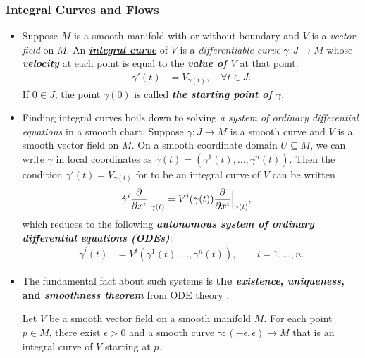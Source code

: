 \documentclass[11pt]{article}
\begin{document}
\subsubsection{Integral Curves and Flows}
\begin{itemize}
\item \begin{definition}
 Suppose $M$ is a smooth manifold with or without boundary and $V$ is a \emph{vector field} on $M$.  An \underline{\emph{\textbf{integral curve}}} of $V$ is a \emph{differentiable curve} $\gamma: J \rightarrow M$ whose \emph{\textbf{velocity}} at each point is equal to the \emph{\textbf{value of $V$}} at that point:
 \begin{align*}
 \gamma'(t) &= V_{\gamma(t)}, \quad \forall t\in J.
 \end{align*} If $0 \in J$, the point $\gamma(0)$ is called \emph{\textbf{the starting point of $\gamma$}}.
\end{definition}

\item \begin{remark}
Finding integral curves boils down to solving \emph{a system of ordinary differential equations} in a smooth chart.  Suppose $\gamma: J \rightarrow M$ is a smooth curve and $V$ is a smooth vector field on $M$. On a smooth coordinate domain $U \subseteq M$, we can write $\gamma$ in local coordinates as $\gamma(t) = (\gamma^{1}(t), \ldots, \gamma^{n}(t))$. Then the condition $\gamma'(t) =  V_{\gamma(t)}$ for to be an integral curve of $V$ can be written
\begin{align}
\dot{\gamma}^{i}\frac{\partial }{ \partial x^{i}}\Bigr|_{\gamma(t)} &= V^{i}(\gamma(t))\frac{\partial }{ \partial x^{i}}\Bigr|_{\gamma(t)}, \label{eqn: integral_curve_differential_equations_1}
\end{align} which reduces to the following \emph{\textbf{autonomous system of ordinary differential equations (ODEs)}}:
\begin{align}
\dot{\gamma}^{i}(t) &= V^{i}(\gamma^{1}(t), \ldots, \gamma^{n}(t)), \qquad i=1,\ldots, n.
\end{align}
\end{remark}

\item The fundamental fact about such systems is \textbf{the \emph{existence}, \emph{uniqueness}, and \emph{smoothness theorem}} from ODE theory \citep{amann2011ordinary, hirsch2012differential}.
\begin{proposition}
Let $V$ be a smooth vector field on a smooth manifold $M$. For each point $p \in M$, there exist $\epsilon > 0$ and a smooth curve $\gamma: (-\epsilon, \epsilon) \rightarrow M$ that is an integral curve of $V$ starting at $p$.
\end{proposition}


\end{itemize}
\end{document}
